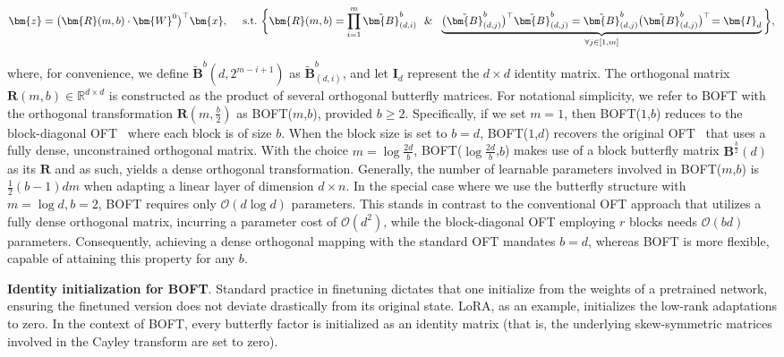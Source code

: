 \begin{equation}
    \begin{aligned}\nonumber
    \bm{z}=\big(\bm{R}(m,b)\cdot\bm{W}^0\big)^\top\bm{x},~~~~\text{s.t.}~\bigg{\{}\bm{R}(m,b)=\prod_{i=1}^m \tilde{\bm{B}}^b_{(d,i)}~~\&~~\underbrace{\big(\tilde{\bm{B}}^b_{(d,j)}\big)^\top\tilde{\bm{B}}^b_{(d,j)}=\tilde{\bm{B}}^b_{(d,j)}\big(\tilde{\bm{B}}^b_{(d,j)}\big)^\top\!=\bm{I}_d}_{\forall j\in [1, m]}\bigg{\}},
    \end{aligned}
\end{equation}

where, for convenience, we define $\tilde{\bm{B}}^b(d,2^{m - i+1})$ as $\tilde{\bm{B}}^b_{(d,i)}$, and let $\bm{I}_d$ represent the $d \times d$ identity matrix. The orthogonal matrix $\bm{R}(m,b)\in\mathbb{R}^{d\times d}$ is constructed as the product of several orthogonal butterfly matrices. For notational simplicity, we refer to BOFT with the orthogonal transformation $\bm{R}(m,\frac{b}{2})$ as BOFT($m$,$b$), provided $b\geq 2$. Specifically, if we set $m=1$, then BOFT($1$,$b$) reduces to the block-diagonal OFT~\cite{qiu2023controlling} where each block is of size $b$. When the block size is set to $b=d$, BOFT($1$,$d$) recovers the original OFT~\cite{qiu2023controlling} that uses a fully dense, unconstrained orthogonal matrix. With the choice $m=\log \frac{2d}{b}$, BOFT($\log \frac{2d}{b}$,$b$) makes use of a block butterfly matrix $\bm{B}^{\frac{b}{2}}(d)$ as its $\bm{R}$ and as such, yields a dense orthogonal transformation. Generally, the number of learnable parameters involved in BOFT($m$,$b$) is $\frac{1}{2}(b-1)dm$ when adapting a linear layer of dimension $d\times n$. In the special case where we use the butterfly structure with $m=\log d, b=2$, BOFT requires only $\mathcal{O}(d\log d)$ parameters. This stands in contrast to the conventional OFT approach that utilizes a fully dense orthogonal matrix, incurring a parameter cost of $\mathcal{O}(d^2)$, while the block-diagonal OFT employing $r$ blocks needs $\mathcal{O}(bd)$ parameters. Consequently, achieving a dense orthogonal mapping with the standard OFT mandates $b=d$, whereas BOFT is more flexible, capable of attaining this property for any $b$.

\textbf{Identity initialization for BOFT}. Standard practice in finetuning dictates that one initialize from the weights of a pretrained network, ensuring the finetuned version does not deviate drastically from its original state. LoRA, as an example, initializes the low-rank adaptations to zero. In the context of BOFT, every butterfly factor is initialized as an identity matrix (that is, the underlying skew-symmetric matrices involved in the Cayley transform are set to zero).

